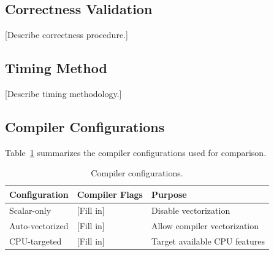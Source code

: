\documentclass[11pt]{article}
\begin{document}
%

\subsection{Correctness Validation}

%

[Describe correctness procedure.]

\subsection{Timing Method}

%

[Describe timing methodology.]

\subsection{Compiler Configurations}

Table~\ref{tab:compiler} summarizes the compiler configurations used
for comparison.

\begin{table}[H]
    \centering
    \caption{Compiler configurations.}
    \label{tab:compiler}
    \begin{tabular}{lll}
        \toprule
        \textbf{Configuration} & \textbf{Compiler Flags} & \textbf{Purpose} \\
        \midrule
        Scalar-only & [Fill in] & Disable vectorization \\
        Auto-vectorized & [Fill in] & Allow compiler vectorization \\
        CPU-targeted & [Fill in] & Target available CPU features \\
        \bottomrule
    \end{tabular}
\end{table}
\end{document}
